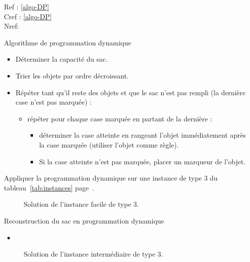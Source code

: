\documentclass[11pt]{article}
\newcommand{\instance}[1]{instance de type #1 du tableau~\ref{tab:instances} page~\pageref{tab:instances}}
\begin{document}
Ref : \ref{algo-DP}
    \\
    Cref : \cref{algo-DP}
    \\
    Nref: 
  \begin{algorithme}{Algorithme de programmation dynamique}
    \label{algo-DP}

    \begin{itemize}
    \item Déterminer la capacité du sac.
    \item Trier les objets par ordre décroissant.
    \item  Répéter tant qu'il reste des objets et que le sac n'est pas rempli (la dernière case n'est pas marquée) :
      \begin{itemize}
      \item répéter pour chaque case marquée en partant de la dernière :
      \begin{itemize}
      \item déterminer la case atteinte en rangeant l'objet immédiatement après la case marquée (utiliser l'objet comme règle).
      \item Si la case atteinte n'est pas marquée, placer un marqueur de l'objet.
      \end{itemize}
      \end{itemize}
    \end{itemize}
  \end{algorithme}


   \begin{exercice}{}
    \label{ex:ex5}
    Appliquer la programmation dynamique sur une \instance{3}.
  \end{exercice}


\begin{figure}[htbp]
  \centering
  \resizebox{0.6\linewidth}{!}{
    
  }
  \caption{Solution de l'instance facile de type 3.}
\end{figure}

\begin{algorithme}{Reconstruction du sac en programmation dynamique}

  \begin{itemize}
      \item
    \end{itemize}
  \end{algorithme}


  \begin{figure}[htbp]
    \centering
    \resizebox{0.6\linewidth}{!}{
      
    }
    \caption{Solution de l'instance intermédiaire de type 3.}
  \end{figure}
\end{document}
